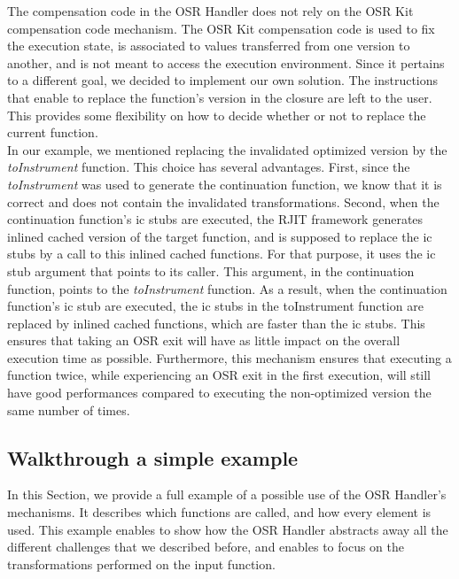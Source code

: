 The compensation code in the OSR Handler does not rely on the OSR Kit compensation code mechanism.
The OSR Kit compensation code is used to fix the execution state, is associated to values transferred from one version to another, and is not meant to access the execution environment.
Since it pertains to a different goal, we decided to implement our own solution.
The instructions that enable to replace the function's version in the closure are left to the user. 
This provides some flexibility on how to decide whether or not to replace the current function.\\

In our example, we mentioned replacing the invalidated optimized version by the \textit{toInstrument} function.
This choice has several advantages.
First, since the \textit{toInstrument} was used to generate the continuation function, we know that it is correct and does not contain the invalidated transformations.
Second, when the continuation function's ic stubs are executed, the RJIT framework generates inlined cached version of the target function, and is supposed to replace the ic stubs by a call to this inlined cached functions.
For that purpose, it uses the ic stub argument that points to its caller.
This argument, in the continuation function, points to the \textit{toInstrument} function.
As a result, when the continuation function's ic stub are executed, the ic stubs in the toInstrument function are replaced by inlined cached functions, which are faster than the ic stubs.
This ensures that taking an OSR exit will have as little impact on the overall execution time as possible.
Furthermore, this mechanism ensures that executing a function twice, while experiencing an OSR exit in the first execution, will still have good performances compared to executing the non-optimized version the same number of times.\\

\subsection{Walkthrough a simple example}
In this Section, we provide a full example of a possible use of the OSR Handler's mechanisms.
It describes which functions are called, and how every element is used.
This example enables to show how the OSR Handler abstracts away all the different challenges that we described before, and enables to focus on the transformations performed on the input function.\\

